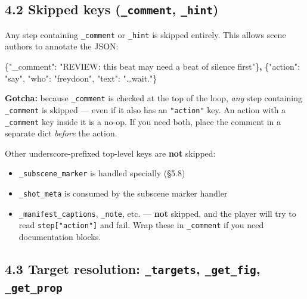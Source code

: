 \documentclass[
  12pt,
  letterpaper,
]{book}
\newenvironment{Shaded}{}{}
\newcommand{\DataTypeTok}[1]{\textcolor[rgb]{0.56,0.13,0.00}{#1}}
\newcommand{\ErrorTok}[1]{\textcolor[rgb]{1.00,0.00,0.00}{\textbf{#1}}}
\newcommand{\FunctionTok}[1]{\textcolor[rgb]{0.02,0.16,0.49}{#1}}
\newcommand{\StringTok}[1]{\textcolor[rgb]{0.25,0.44,0.63}{#1}}
\providecommand{\tightlist}{%
  \setlength{\itemsep}{0pt}\setlength{\parskip}{0pt}}
\begin{document}
\subsection{\texorpdfstring{4.2 Skipped keys (\texttt{\_comment},
\texttt{\_hint})}{4.2 Skipped keys (\_comment, \_hint)}}\label{skipped-keys-_comment-_hint}

Any step containing \texttt{\_comment} or \texttt{\_hint} is skipped
entirely. This allows scene authors to annotate the JSON:

\begin{Shaded}
\begin{Highlighting}[]
\FunctionTok{\{}\DataTypeTok{"\_comment"}\FunctionTok{:} \StringTok{"REVIEW: this beat may need a beat of silence first"}\FunctionTok{\}}\ErrorTok{,}
\FunctionTok{\{}\DataTypeTok{"action"}\FunctionTok{:} \StringTok{"say"}\FunctionTok{,} \DataTypeTok{"who"}\FunctionTok{:} \StringTok{"freydoon"}\FunctionTok{,} \DataTypeTok{"text"}\FunctionTok{:} \StringTok{"…wait."}\FunctionTok{\}}
\end{Highlighting}
\end{Shaded}

\textbf{Gotcha:} because \texttt{\_comment} is checked at the top of the
loop, \emph{any} step containing \texttt{\_comment} is skipped --- even
if it also has an \texttt{"action"} key. An action with a
\texttt{\_comment} key inside it is a no-op. If you need both, place the
comment in a separate dict \emph{before} the action.

Other underscore-prefixed top-level keys are \textbf{not} skipped:

\begin{itemize}
\tightlist
\item
  \texttt{\_subscene\_marker} is handled specially (§5.8)
\item
  \texttt{\_shot\_meta} is consumed by the subscene marker handler
\item
  \texttt{\_manifest\_captions}, \texttt{\_note}, etc. --- \textbf{not}
  skipped, and the player will try to read \texttt{step{[}"action"{]}}
  and fail. Wrap these in \texttt{\_comment} if you need documentation
  blocks.
\end{itemize}

\subsection{\texorpdfstring{4.3 Target resolution: \texttt{\_targets},
\texttt{\_get\_fig},
\texttt{\_get\_prop}}{4.3 Target resolution: \_targets, \_get\_fig, \_get\_prop}}\label{target-resolution-_targets-_get_fig-_get_prop}
\end{document}
